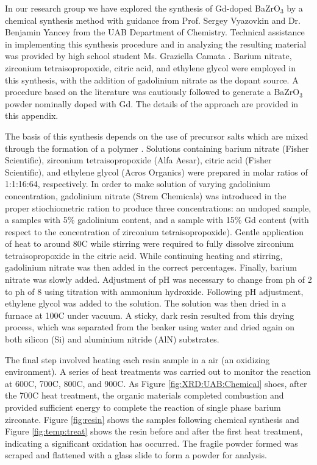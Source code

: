 

In our research group we have explored the synthesis of Gd-doped BaZrO$_3$ by a chemical synthesis method with guidance from Prof. Sergey Vyazovkin and Dr. Benjamin Yancey from the UAB Department of Chemistry. Technical assistance in implementing this synthesis procedure and in analyzing the resulting material was provided by high school student Ms. Graziella Camata \cite{GCamata2015}. Barium nitrate, zirconium tetraisopropoxide, citric acid, and ethylene glycol were employed in this synthesis, with the addition of gadolinium nitrate as the dopant source. A procedure based on the literature was cautiously followed to generate a BaZrO$_3$ powder nominally doped with Gd. The details of the approach are provided in this appendix. 

The basis of this synthesis depends on the use of precursor salts which are mixed through the formation of a polymer \cite{Bernardi2007, Rosario2012}. Solutions containing barium nitrate (Fisher Scientific), zirconium tetraisopropoxide (Alfa Aesar), citric acid (Fisher Scientific), and ethylene glycol (Acros Organics) were prepared in molar ratios of 1:1:16:64, respectively. In order to make solution of varying gadolinium concentration, gadolinium nitrate (Strem Chemicals) was introduced in the proper stiochiometric ration to produce three concentrations: an undoped sample, a samples with 5\% gadolinium content, and a sample with 15\% Gd content (with respect to the concentration of zirconium tetraisopropoxide). Gentle application of heat to around 80\textdegree C while stirring were required to fully dissolve zirconium tetraisopropoxide in the citric acid. While continuing heating and stirring, gadolinium nitrate was then added in the correct percentages. Finally, barium nitrate was slowly added. Adjustment of pH was necessary to change from ph of 2 to ph of 8 using titration with ammonium hydroxide. Following pH adjustment, ethylene glycol was added to the solution. The solution was then dried in a furnace at 100\textdegree C under vacuum. A sticky, dark resin resulted from this drying process, which was separated from the beaker using water and dried again on both silicon (Si) and aluminium nitride (AlN) substrates.

The final step involved heating each resin sample in a air (an oxidizing environment). A series of heat treatments was carried out to monitor the reaction at 600\textdegree C, 700\textdegree C, 800\textdegree C, and 900\textdegree C. As Figure \ref{fig:XRD:UAB:Chemical} shoes, after the 700\textdegree C heat treatment, the organic materials completed combustion and provided sufficient energy to complete the reaction of single phase barium zirconate. Figure \ref{fig:resin} shows the samples following chemical synthesis and Figure \ref{fig:temp:treat} shows the resin before and after the first heat treatment, indicating a significant oxidation has occurred. The fragile powder formed was scraped and flattened with a glass slide to form a powder for analysis.

